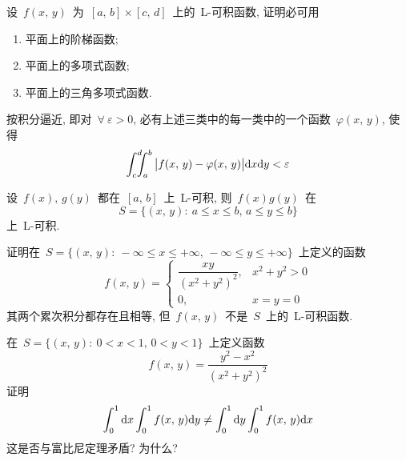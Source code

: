 \begin{problemset}
\item 设~$f(x,\, y)$~为~$[a,\,  b] \times [c,\, d]$~上的~L-可积函数, 证明必可用
\begin{enumerate}
  \item[(1)] 平面上的阶梯函数;
  \item[(2)] 平面上的多项式函数;
  \item[(3)] 平面上的三角多项式函数.
\end{enumerate}
按积分逼近, 即对~$\forall~\varepsilon > 0$, 必有上述三类中的每一类中的一个函数~$\varphi(x,\, y)$, 使得
\[
\int_c^d \!\!\!\!\int_a^b \big| f(x,\, y) - \varphi(x,\, y) \big| \mathrm{d} x \mathrm{d} y < \varepsilon
\]

\item 设~$f(x),\,  g(y)$~都在~$[a,\,  b]$~上~L-可积, 则~$f(x)g(y)$~在
\[
S=\{(x,\, y):\: a \leqslant x \leqslant b, \, a \leqslant y \leqslant b \}
\]
上~L-可积.

\item 证明在~$S=\{(x,\, y):\: -\infty \leqslant x \leqslant +\infty, \, -\infty \leqslant y \leqslant +\infty \}$~上定义的函数
\[
f(x,\, y)= \left\{\!\!
\begin{array}{cl}
\dfrac{xy}{(x^2 + y^2)^2}, &  x^2 + y^2 > 0  \\[0.2cm]
0, &  x= y = 0
\end{array}
\right.
\]
其两个累次积分都存在且相等, 但~$f(x,\, y)$~不是~$S$~上的~L-可积函数.

\item 在~$S = \{(x,\, y):\: 0 < x < 1,\,  0 <y <1\}$~上定义函数
\[
f(x,\, y) = \frac{y^2-x^2}{(x^2+y^2)^2}
\]
证明
\[
\int_0^1 \mathrm{d} x \int_0^1 f(x,\, y) \mathrm{d} y \neq \int_0^1 \mathrm{d} y \int_0^1 f(x,\, y) \mathrm{d} x
\]
这是否与富比尼定理矛盾? 为什么?
\end{problemset}
